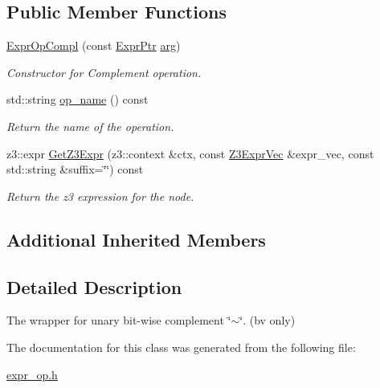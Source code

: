 \subsection*{Public Member Functions}
\begin{DoxyCompactItemize}
\item 
\mbox{\label{classilang_1_1_expr_op_compl_a1ad7bd68b3ab0ebf08f3d09cd32625d0}} 
\mbox{\hyperlink{classilang_1_1_expr_op_compl_a1ad7bd68b3ab0ebf08f3d09cd32625d0}{Expr\+Op\+Compl}} (const \mbox{\hyperlink{classilang_1_1_expr_a85952b6a34620c4c8cab6bac9c9fdf8c}{Expr\+Ptr}} \mbox{\hyperlink{classilang_1_1_expr_a754c28cd350d28c7bdc8fffe7fe22ec2}{arg}})
\begin{DoxyCompactList}\small\item\em Constructor for Complement operation. \end{DoxyCompactList}\item 
\mbox{\label{classilang_1_1_expr_op_compl_a35076d43626b208e5a2ac6060ad75d91}} 
std\+::string \mbox{\hyperlink{classilang_1_1_expr_op_compl_a35076d43626b208e5a2ac6060ad75d91}{op\+\_\+name}} () const
\begin{DoxyCompactList}\small\item\em Return the name of the operation. \end{DoxyCompactList}\item 
\mbox{\label{classilang_1_1_expr_op_compl_afdf0473da8ff7c20adc956dd08ed9466}} 
z3\+::expr \mbox{\hyperlink{classilang_1_1_expr_op_compl_afdf0473da8ff7c20adc956dd08ed9466}{Get\+Z3\+Expr}} (z3\+::context \&ctx, const \mbox{\hyperlink{namespaceilang_adc4eee919aa24fff882d03a48d733c19}{Z3\+Expr\+Vec}} \&expr\+\_\+vec, const std\+::string \&suffix=\char`\"{}\char`\"{}) const
\begin{DoxyCompactList}\small\item\em Return the z3 expression for the node. \end{DoxyCompactList}\end{DoxyCompactItemize}
\subsection*{Additional Inherited Members}


\subsection{Detailed Description}
The wrapper for unary bit-\/wise complement \char`\"{}$\sim$\char`\"{}. (bv only) 

The documentation for this class was generated from the following file\+:\begin{DoxyCompactItemize}
\item 
\mbox{\hyperlink{expr__op_8h}{expr\+\_\+op.\+h}}\end{DoxyCompactItemize}
